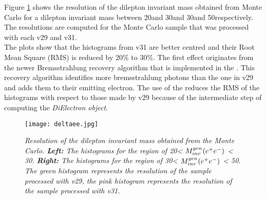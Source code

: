 Figure \ref{fig:deltaee} shows the resolution of the dilepton invariant mass obtained from \BdKstee Monte Carlo for a dilepton invariant mass between 20\mevcc and 30\mevcc and 30\mevcc and 50\mevcc respectively. The resolutions are computed for the Monte Carlo sample that was processed with each  \davinci v29 and \davinci v31.\\
The plots show that the histograms from \davinci v31 are better centred and their Root Mean Square (RMS) is reduced by 20\% to 30\%. The first effect originates from the newer Bremsstrahlung recovery algorithm that is implemented in the \dielectronmaker. This recovery algorithm identifies more bremsstrahlung photons than the one in \davinci v29 and adds them to their emitting electron. The use of the \dielectronmaker reduces the RMS of the histograms with respect to those made by \davinci v29 because of the intermediate step of computing the \textit{DiElectron object}.
\begin{figure}[!h]
\vspace*{-0.cm}
  \begin{center}
    \texttt{[image: deltaee.jpg]}
  \vspace*{-0.5cm}
  \end{center}
  \caption{\textit{Resolution of the dilepton invariant mass obtained from the \BdKstee Monte Carlo. \textbf{Left:} The histograms for the region of 20\mevcc < $M^{gen}_{inv}(e^+e^-)$ < 30\mevcc. \textbf{Right:} The histograms for the region of 30\mevcc < $M^{gen}_{inv}(e^+e^-)$ < 50\mevcc. The green histogram represents the resolution of the sample processed with \davinci v29, the pink histogram represents the resolution of the sample processed with \davinci v31.}}
  \label{fig:deltaee}
\end{figure}
\\
\vspace*{1.cm}
